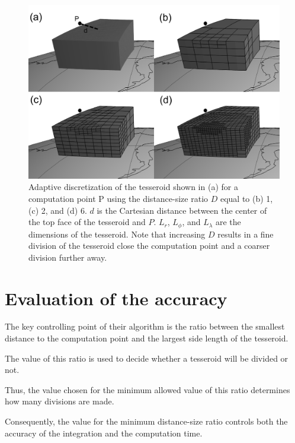 \documentclass[paper,twocolumn]{geophysics}
\begin{document}
\begin{figure}
    \centering
    \includegraphics{figs/tesseroid-split}
    \caption{
        Adaptive discretization
        of the tesseroid shown in (a)
        for a computation point P
        using the distance-size ratio $D$ equal to
        (b) 1, (c) 2, and (d) 6.
        $d$ is the Cartesian distance between
        the center of the top face of the tesseroid
        and $P$.
        $L_r$, $L_\phi$, and $L_\lambda$ are the dimensions of the tesseroid.
        Note that increasing $D$
        results in a fine division of the tesseroid
        close the computation point
        and a coarser division further away.
    }
    \label{fig:division}
\end{figure}


\section{Evaluation of the accuracy}

The key controlling point of their algorithm is the ratio between
the smallest distance to the computation point and
the largest side length of the tesseroid.

The value of this ratio is used to decide whether a tesseroid will be divided
or not.

Thus, the value chosen for the minimum allowed value of this ratio determines
how many divisions are made.

Consequently, the value for the minimum distance-size ratio controls both the
accuracy of the integration and the computation time.
\end{document}

